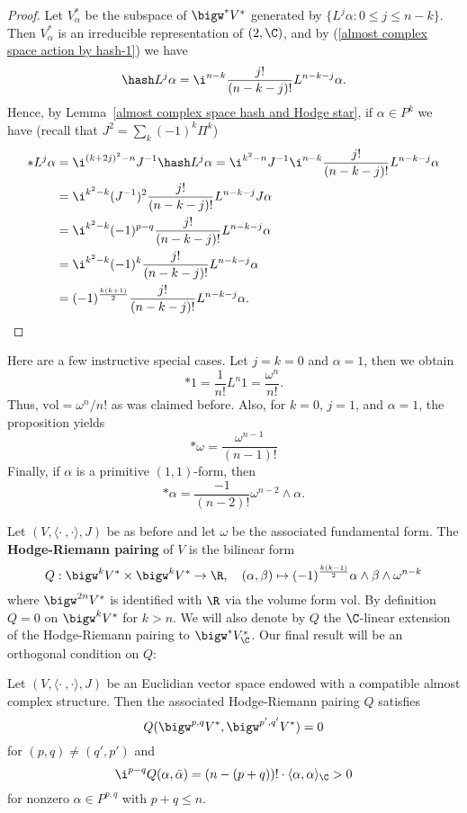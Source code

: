 \begin{proof}
Let $V^*_\alpha$ be the subspace of $\bigw^*V^*$ generated by $\{L^j\alpha:0\leq j\leq n-k\}$. Then $V^*_\alpha$ is an irreducible representation of $\sl(2,\C)$, and by (\ref{almost complex space action by hash-1}) we have
\[\hash L^j\alpha=\i^{n-k}\frac{j!}{(n-k-j)!}L^{n-k-j}\alpha.\]
Hence, by Lemma~\ref{almost complex space hash and Hodge star}, if $\alpha\in P^k$ we have (recall that $J^2=\sum_k(-1)^k\Pi^k$)
\begin{align*}
\ast L^j\alpha&=\i^{(k+2j)^2-n}J^{-1}\hash L^j\alpha=\i^{k^2-n}J^{-1}\i^{n-k}\frac{j!}{(n-k-j)!}L^{n-k-j}\alpha\\
&=\i^{k^2-k}(J^{-1})^2\frac{j!}{(n-k-j)!}L^{n-k-j}J\alpha\\
&=\i^{k^2-k}(-1)^{p-q}\frac{j!}{(n-k-j)!}L^{n-k-j}\alpha\\
&=\i^{k^2-k}(-1)^{k}\frac{j!}{(n-k-j)!}L^{n-k-j}\alpha\\
&=(-1)^{\frac{k(k+1)}{2}}\frac{j!}{(n-k-j)!}L^{n-k-j}\alpha.\qedhere
\end{align*}
\end{proof}
\begin{example}
Here are a few instructive special cases. Let $j=k=0$ and $\alpha=1$, then we obtain 
\[\ast 1=\frac{1}{n!}L^n1=\frac{\omega^n}{n!}.\]
Thus, $\mathrm{vol}=\omega^n/n!$ as was claimed before. Also, for $k=0$, $j=1$, and $\alpha=1$, the proposition yields 
\[\ast\omega=\frac{\omega^{n-1}}{(n-1)!}\]
Finally, if $\alpha$ is a primitive $(1,1)$-form, then
\[\ast\alpha=\frac{-1}{(n-2)!}\omega^{n-2}\wedge\alpha.\]
\end{example}
Let $(V,\langle\cdot\ ,\cdot\rangle,J)$ be as before and let $\omega$ be the associated fundamental form. The \textbf{Hodge-Riemann pairing} of $V$ is the bilinear form
\[Q:\bigw^kV^*\times\bigw^kV^*\to\R,\quad (\alpha,\beta)\mapsto(-1)^{\frac{k(k-1)}{2}}\alpha\wedge\beta\wedge\omega^{n-k}\]
where $\bigw^{2n}V^*$ is identified with $\R$ via the volume form $\mathrm{vol}$. By definition $Q=0$ on $\bigw^kV^*$ for $k>n$. We will also denote by $Q$ the $\C$-linear extension of the Hodge-Riemann pairing to $\bigw^*V^*_{\C}$. Our final result will be an orthogonal condition on $Q$:
\begin{proposition}\label{almost complex space Hodge-Riemann bilinear relation}
Let $(V,\langle\cdot\ ,\cdot\rangle,J)$ be an Euclidian vector space endowed with a compatible almost complex structure. Then the associated Hodge-Riemann pairing $Q$ satisfies
\[Q(\bigw^{p,q}V^*,\bigw^{p',q'}V^*)=0\]
for $(p,q)\neq(q',p')$ and
\[\i^{p-q}Q(\alpha,\bar{\alpha})=(n-(p+q))!\cdot\langle\alpha,\alpha\rangle_{\C}>0\]
for nonzero $\alpha\in P^{p,q}$ with $p+q\leq n$.
\end{proposition}
